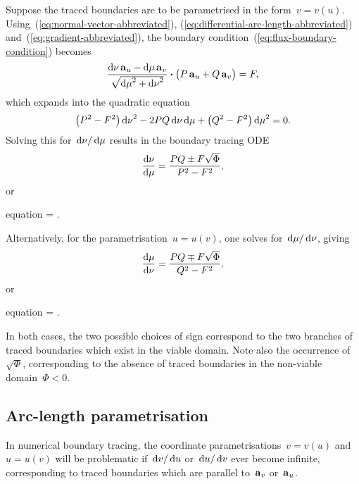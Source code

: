 Suppose the traced boundaries are to be parametrised
in the form~$v = v (u)$.
Using~(\ref{eq:normal-vector-abbreviated}),
(\ref{eq:differential-arc-length-abbreviated})
and~(\ref{eq:gradient-abbreviated}),
the boundary condition~(\ref{eq:flux-boundary-condition}) becomes
\[
  \frac{
    \td \nu \basisvec{u} - \td \mu \basisvec{v}
  }{
    \sqrt{{\td \mu}^2 + {\td \nu}^2}
  }
    \dotp
  \roundbr[\big]{P \basisvec{u} + Q \basisvec{v}}
    =
  F,
\]
which expands into the quadratic equation
\begin{equation}
  \roundbr*{P^2 - F^2} \, {\td \nu}^2
  - 2 P Q \td \nu \td \mu
  + \roundbr*{Q^2 - F^2} \, {\td \mu}^2
    =
  0.
  \label{eq:tracing-coordinate-parametrisation-quadratic}
\end{equation}
Solving this for~$\mathop{}\!\mathrm{d} \nu / \mathop{}\!\mathrm{d} \mu$ results in the boundary tracing ODE
\begin{equation}
  \frac{\mathop{}\!\mathrm{d} \nu}{\mathop{}\!\mathrm{d} \mu} = \frac{P Q \pm F \sqrt{\Phi}}{P^2 - F^2},
  \label{eq:tracing-ode-coordinate-parametrisation-nu}
\end{equation}
or
\begin{important}{equation}
   =
    \frac{\scalefac[u]}{\scalefac[v]}
      \cdot
    .
  \label{eq:tracing-ode-coordinate-parametrisation-v}
\end{important}
Alternatively, for the parametrisation~$u = u (v)$,
one solves for~$\mathop{}\!\mathrm{d} \mu / \mathop{}\!\mathrm{d} \nu$, giving
\begin{equation}
  \frac{\mathop{}\!\mathrm{d} \mu}{\mathop{}\!\mathrm{d} \nu} = \frac{P Q \mp F \sqrt{\Phi}}{Q^2 - F^2},
  \label{eq:tracing-ode-coordinate-parametrisation-mu}
\end{equation}
or
\begin{important}{equation}
   =
    \frac{\scalefac[v]}{\scalefac[u]}
      \cdot
    .
  \label{eq:tracing-ode-coordinate-parametrisation-u}
\end{important}
In both cases, the two possible choices of sign
correspond to the two branches of traced boundaries
which exist in the viable domain.
Note also the occurrence of~$\sqrt{\Phi}$,
corresponding to the absence of traced boundaries
in the non-viable domain~$\Phi < 0$.

\subsection{Arc-length parametrisation}
\label{sec:curvilinear.tracing.arc-length}

In numerical boundary tracing,
the coordinate parametrisations~$v = v (u)$ and~$u = u (v)$
will be problematic
if~$\mathop{}\!\mathrm{d} v / \mathop{}\!\mathrm{d} u$ or~$\mathop{}\!\mathrm{d} u / \mathop{}\!\mathrm{d} v$ ever become infinite,
corresponding to traced boundaries
which are parallel to~$\mathop{}\!\boldsymbol{\mathrm{a}}_{v}$ or~$\mathop{}\!\boldsymbol{\mathrm{a}}_{u}$.

